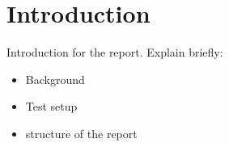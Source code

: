 \section{Introduction}

Introduction for the report. Explain briefly:

\begin{itemize}
  \item Background
  \item Test setup
  \item structure of the report
\end{itemize}
